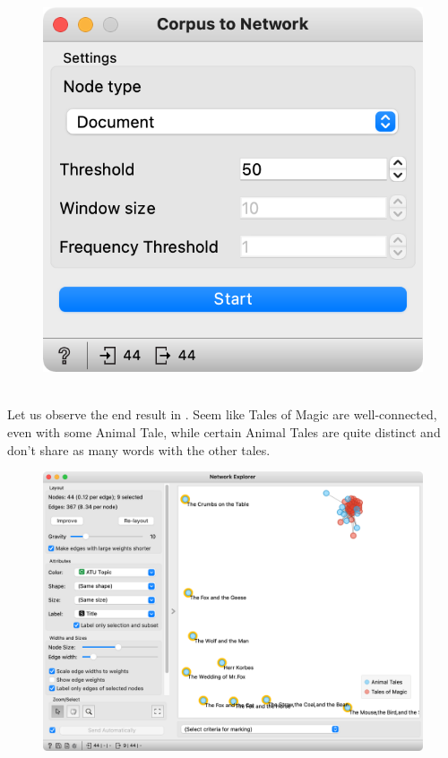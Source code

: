 \begin{figure}[h]
    \centering
    \includegraphics[scale=0.6]{corpus-to-network.png}
    \caption{$\;$}
\end{figure}

Let us observe the end result in . Seem like Tales of Magic are well-connected, even with some Animal Tale, while certain Animal Tales are quite distinct and don't share as many words with the other tales.

\begin{figure}[h]
    \centering
    \includegraphics[width=0.9\linewidth]{network-explorer.png}
    \caption{$\;$}
\end{figure}

